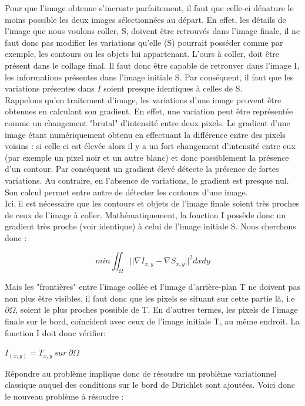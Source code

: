 Pour que l'image obtenue s'incruste parfaitement, il faut que celle-ci dénature le moins possible les deux images sélectionnées au départ. En effet, les détails de l'image que nous voulons coller, S, doivent être retrouvés dans l'image finale, il ne faut donc pas modifier les variations qu'elle (S) pourrait posséder comme par exemple, les contours ou les objets lui appartenant. L'ours  à coller, doit être présent dans le collage final. Il faut donc être capable de retrouver dans l'image I, les informations présentes dans l'image initiale S. Par conséquent, il faut que les variations présentes dans $I$ soient presque identiques à celles de S.\\
Rappelons qu'en traitement d'image, les variations d'une image peuvent être obtenues en calculant son gradient. En effet, une variation peut être représentée comme un changement "brutal" d'intensité entre deux pixels. Le gradient d'une image étant numériquement obtenu en effectuant la différence entre des pixels voisins : si celle-ci est élevée alors il y a un fort changement d'intensité entre eux (par exemple un pixel noir et un autre blanc) et donc possiblement la présence d'un contour. Par conséquent un gradient élevé détecte la présence de fortes variations. Au contraire, en l'absence de variations, le gradient est presque nul. Son calcul permet entre autre de détecter les contours d'une image.\\
Ici, il est nécessaire que les contours et objets de l'image finale soient très proches de ceux de l'image à coller. Mathématiquement, la fonction I possède donc un gradient très proche (voir identique) à celui de l'image initiale S. Nous cherchons donc :
\begin{center}
    $$ min \iint_\Omega || \nabla I_{x,y} - \nabla S_{x,y}||^2 dxdy$$
\end{center} 

Mais les "frontières" entre l'image collée et l'image d'arrière-plan T ne doivent pas non plus être visibles, il faut donc que les pixels se situant sur cette partie là, i.e $\partial \Omega$, soient le plus proches possible de T. En d'autres termes, les pixels de l'image finale sur le bord, coïncident avec ceux de l'image initiale T, au même endroit. La fonction I doit donc vérifier: 
\begin{center}
    $I_{(x,y)} = T_{x,y} \ sur\ \partial \Omega$
\end{center}

Répondre au problème implique donc de résoudre un problème variationnel classique auquel des conditions sur le bord de Dirichlet sont ajoutées. 
Voici donc le nouveau problème à résoudre :   


